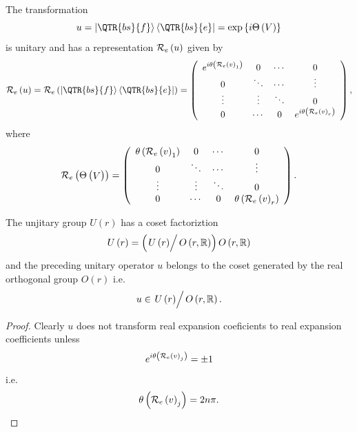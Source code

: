 \begin{remark}
The transformation 
\begin{equation}
u=\left\vert \QTR{bs}{f}\right\rangle \left\langle \QTR{bs}{e}\right\vert
=\exp \left\{ i\Theta \left( {\sl V}\right) \right\}
\end{equation}%
is unitary and has a representation ${\cal R}_{e}\left( u\right) $ given by 
\begin{equation}
{\cal R}_{e}\left( u\right) ={\cal R}_{e}\left( \left\vert \QTR{bs}{f}%
\right\rangle \left\langle \QTR{bs}{e}\right\vert \right) =\left( 
\begin{array}{cccc}
e^{i\theta \left( {\cal R}_{e}\left( v\right) _{1}\right) } & 0 & \cdots & 0
\\ 
0 & \ddots & \cdots & \vdots \\ 
\vdots & \vdots & \ddots & 0 \\ 
0 & \cdots & 0 & e^{i\theta \left( {\cal R}_{e}\left( v\right) _{r}\right) }%
\end{array}%
\right) ,
\end{equation}%
where 
\begin{equation}
{\cal R}_{e}\left( \Theta \left( \stackrel{}{{\sl V}}\right) \right) =\left( 
\begin{array}{cccc}
\theta \left( {\cal R}_{e}\left( v\right) _{1}\right) & 0 & \cdots & 0 \\ 
0 & \ddots & \cdots & \vdots \\ 
\vdots & \vdots & \ddots & 0 \\ 
0 & \cdots & 0 & \theta \left( {\cal R}_{e}\left( v\right) _{r}\right)%
\end{array}%
\right) .
\end{equation}
\end{remark}

\begin{lemma}
The unjitary group $U\left( r\right) $ has a coset factoriztion 
\begin{equation}
U\left( r\right) =\left( \left. \stackrel{}{U\left( r\right) }\right/
O\left( r,{\Bbb R}\right) \right) O\left( r,{\Bbb R}\right)
\end{equation}%
and the preceding unitary operator $u$ belongs to the coset generated by the
real orthogonal group $O\left( r\right) $ i.e. 
\begin{equation}
u\in \left. \stackrel{}{U\left( r\right) }\right/ O\left( r,{\Bbb R}\right) .
\end{equation}

\begin{proof}
Clearly $u$ does not transform real expansion coeficients to real expansion
coefficients unless   
\begin{equation}
e^{i\theta \left( {\cal R}_{e}\left( v\right) _{j}\right) }=\pm 1
\end{equation}%
i.e.%
\begin{equation}
\theta \left( {\cal R}_{e}\left( v\right) _{j}\right) =2n\pi .
\end{equation}
\end{proof} 
\end{lemma}

